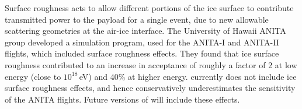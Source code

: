 Surface roughness acts to allow different portions of the ice surface to contribute transmitted power to the payload for a single event, due to new allowable scattering geometries at the air-ice interface.
The University of Hawaii ANITA group developed a simulation program, used for the ANITA-I and ANITA-II flights, which included surface roughness effects. They found that ice surface roughness contributed to an increase in acceptance of roughly a factor of 2 at low energy (close to $10^{18}$\,eV) and 40\% at higher energy.
\icemc currently does not include ice surface roughness effects, and hence conservatively underestimates the sensitivity of the ANITA flights. Future versions of \icemc will include these effects.








